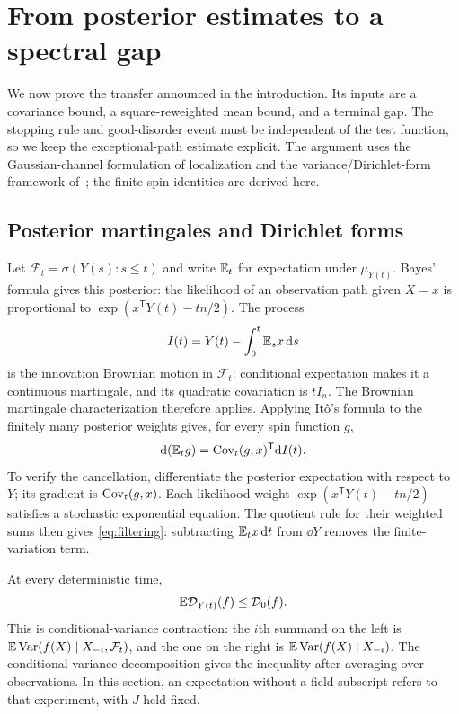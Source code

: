 \section{From posterior estimates to a spectral gap}\label{sec:observation}

We now prove the transfer announced in the introduction. Its inputs are
a covariance bound, a square-reweighted mean bound, and a terminal gap.
The stopping rule and good-disorder event must be independent of the test
function, so we keep the exceptional-path estimate explicit. The argument
uses the Gaussian-channel formulation of localization
\cite{ElAlaouiMontanari2021} and the variance/Dirichlet-form framework
of~\cite{CE2025}; the finite-spin identities are derived here.

\subsection{Posterior martingales and Dirichlet forms}
Let $\mathcal F_t=\sigma(Y(s):s\le t)$ and write $\mathbb E_t$ for expectation under
$\mu_{Y(t)}$. Bayes' formula gives this posterior: the likelihood of an
observation path given $X=x$ is proportional to
$\exp(x^{\mathsf T}Y(t)-tn/2)$. The process
\[
 I(t)=Y(t)-\int_0^t\mathbb E_s x\,\mathrm d s
\]
is the innovation Brownian motion in $\mathcal F_t$: conditional
expectation makes it a continuous martingale, and its quadratic
covariation is $tI_n$. The Brownian martingale characterization therefore
applies. Applying It\^o's formula to the finitely many posterior weights
gives, for every spin function $g$,
\begin{equation}\label{eq:filtering}
 \mathrm d(\mathbb E_t g)=\operatorname{Cov}_t(g,x)^{\mathsf T}\mathrm d I(t).
\end{equation}
To verify the cancellation, differentiate the posterior expectation with
respect to $Y$; its gradient is $\operatorname{Cov}_t(g,x)$. Each likelihood weight
$\exp(x^{\mathsf T}Y(t)-tn/2)$ satisfies a stochastic exponential
equation. The quotient rule for their weighted sums then gives
\eqref{eq:filtering}: subtracting $\mathbb E_t x\,\mathrm d t$ from $\dd Y$ removes
the finite-variation term.

At every deterministic time,
\begin{equation}\label{eq:dirichlet-monotonicity}
 \mathbb E\mathcal D_{Y(t)}(f)\le\mathcal D_0(f).
\end{equation}
This is conditional-variance contraction: the $i$th summand on the left
is $\mathbb E\operatorname{Var}(f(X)\mid X_{-i},\mathcal F_t)$, and the one on the right is
$\mathbb E\operatorname{Var}(f(X)\mid X_{-i})$. The conditional variance decomposition gives
the inequality after averaging over observations. In this section, an
expectation without a field subscript refers to that experiment, with
$J$ held fixed.

